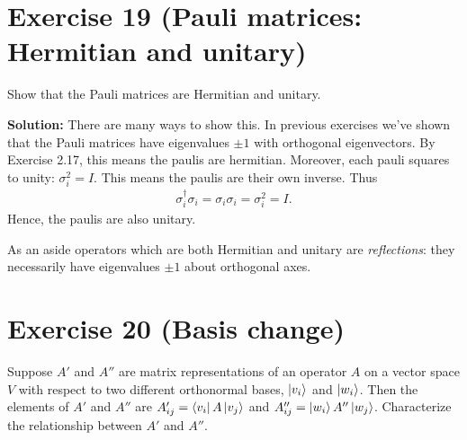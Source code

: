 \documentclass{book}
\begin{document}
\section*{Exercise 19 (Pauli matrices: Hermitian and unitary)}
    Show that the Pauli matrices are Hermitian and unitary.
    
    \textbf{Solution:} There are many ways to show this. In previous exercises we've shown that the Pauli matrices have eigenvalues $\pm 1$ with orthogonal eigenvectors. By Exercise 2.17, this means the paulis are hermitian. Moreover, each pauli squares to unity: $\sigma_i^2 = I$. This means the paulis are their own inverse. Thus
    \begin{align}
        \sigma_i^\dagger \sigma_i = \sigma_i \sigma_i = \sigma_i^2 = I.
    \end{align}
    Hence, the paulis are also unitary.
    
    As an aside operators which are both Hermitian and unitary are \emph{reflections}: they necessarily have eigenvalues $\pm 1$ about orthogonal axes.
    
\section*{Exercise 20 (Basis change)}
    Suppose $A'$ and $A''$ are matrix representations of an operator $A$ on a vector space $V$ with respect to two different orthonormal bases, $\ket{v_i}$ and $\ket{w_i}$. Then the elements of $A'$ and $A''$ are $A'_{ij} = \bra{v_i}A\ket{v_j}$ and $A''_{ij} = \ket{w_i}A''\ket{w_j}$. Characterize the relationship between $A'$ and $A''$.
    
\end{document}
